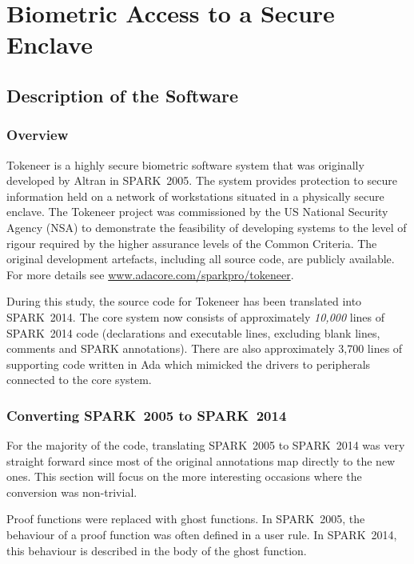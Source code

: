 \documentclass[10pt,a4paper,twocolumn]{article}
\newcommand{\oldspark}{SPARK~2005\xspace}
\newcommand{\newspark}{SPARK~2014\xspace}
\begin{document}
\section{Biometric Access to a Secure Enclave}


\subsection{Description of the Software}

\subsubsection{Overview}

Tokeneer is a highly secure biometric software system that was
originally developed by Altran in \oldspark. The system provides
protection to secure information held on a network of workstations
situated in a physically secure enclave. The Tokeneer project was
commissioned by the US National Security Agency (NSA) to demonstrate
the feasibility of developing systems to the level of rigour required
by the higher assurance levels of the Common Criteria. The original
development artefacts, including all source code, are publicly
available. For more details see
\url{www.adacore.com/sparkpro/tokeneer}.

During this study, the source code for Tokeneer has been translated
into \newspark. The core system now consists of approximately
\emph{10,000} lines of \newspark code (declarations and executable
lines, excluding blank lines, comments and SPARK annotations). There
are also approximately 3,700 lines of supporting code written in Ada
which mimicked the drivers to peripherals connected to the core
system.

\subsubsection{Converting \oldspark to \newspark}

For the majority of the code, translating \oldspark to \newspark was
very straight forward since most of the original annotations map
directly to the new ones. This section will focus on the more
interesting occasions where the conversion was non-trivial.

Proof functions were replaced with ghost functions. In \oldspark, the
behaviour of a proof function was often defined in a user rule. In
\newspark, this behaviour is described in the body of the ghost
function.
\end{document}
